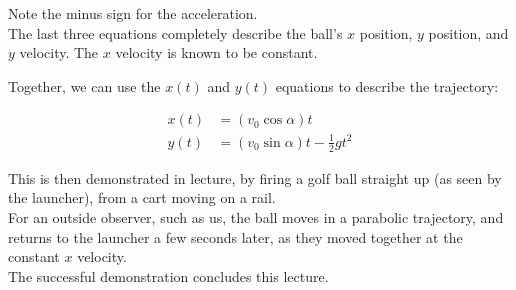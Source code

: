 Note the minus sign for the acceleration.\\
The last three equations completely describe the ball's $x$ position, $y$ position, and $y$ velocity. The $x$ velocity is known to be constant.

Together, we can use the $x(t)$ and $y(t)$ equations to describe the trajectory:

\begin{align*}
x(t) &= (v_0 \cos \alpha) t\\
y(t) &= (v_0 \sin \alpha) t - \frac{1}{2} g t^2
\end{align*}

This is then demonstrated in lecture, by firing a golf ball straight up (as seen by the launcher), from a cart moving on a rail.\\
For an outside observer, such as us, the ball moves in a parabolic trajectory, and returns to the launcher a few seconds later, as they moved together at the constant $x$ velocity.\\
The successful demonstration concludes this lecture.
